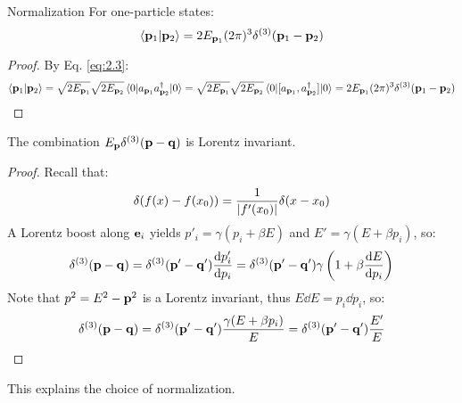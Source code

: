 \begin{proposition}{Normalization}{}
  For one-particle states:
  \begin{equation}
    \braket{\mathbf{p}_1 | \mathbf{p}_2} = 2E_{\mathbf{p}_1} (2\pi)^3 \delta^{(3)}(\mathbf{p}_1 - \mathbf{p}_2)
    \label{eq:2.5}
  \end{equation}

  \begin{proof}
    By Eq. \ref{eq:2.3}:
    \begin{equation*}
      \braket{\mathbf{p}_1 | \mathbf{p}_2} = \sqrt{2E_{\mathbf{p}_1}} \sqrt{2E_{\mathbf{p}_2}} \braket{0 | a_{\mathbf{p}_1} a_{\mathbf{p}_2}^\dagger | 0}
      = \sqrt{2E_{\mathbf{p}_1}} \sqrt{2E_{\mathbf{p}_2}} \braket{0 | [a_{\mathbf{p}_1} , a_{\mathbf{p}_2}^\dagger] | 0} = 2E_{\mathbf{p}_1} (2\pi)^3 \delta^{(3)}(\mathbf{p}_1 - \mathbf{p}_2)
    \end{equation*}
  \end{proof}
\end{proposition}

\begin{lemma}{}{}
  The combination $ E_{\mathbf{p}} \delta^{(3)}(\mathbf{p} - \mathbf{q}) $ is Lorentz invariant.

  \tcblower

  \begin{proof}
    Recall that:
    \begin{equation}
      \delta(f(x) - f(x_0)) = \frac{1}{\left\lvert f'(x_0)\right\rvert} \delta(x - x_0)
      \label{eq:2.6}
    \end{equation}
    A Lorentz boost along $ \mathbf{e}_i $ yields $ p'_i = \gamma (p_i + \beta E) $ and $ E' = \gamma (E + \beta p_i) $, so:
    \begin{equation*}
        \delta^{(3)}(\mathbf{p} - \mathbf{q})
        = \delta^{(3)}(\mathbf{p}' - \mathbf{q}') \frac{\mathrm{d} p'_i}{\mathrm{d} p_i}
        = \delta^{(3)}(\mathbf{p}' - \mathbf{q}') \gamma \left( 1 + \beta \frac{\mathrm{d} E}{\mathrm{d} p_i} \right)
    \end{equation*}
    Note that $ p^2 = E^2 - \mathbf{p}^2 $ is a Lorentz invariant, thus $ E \dd E = p_i \dd p_i $, so:
    \begin{equation*}
      \delta^{(3)}(\mathbf{p} - \mathbf{q})
      = \delta^{(3)}(\mathbf{p}' - \mathbf{q}') \frac{\gamma (E + \beta p_i)}{E}
      = \delta^{(3)}(\mathbf{p}' - \mathbf{q}') \frac{E'}{E}
    \end{equation*}
  \end{proof}
\end{lemma}

This explains the choice of normalization.

